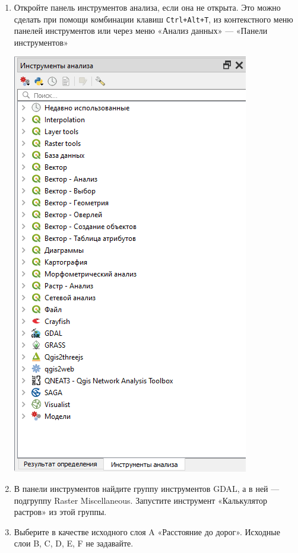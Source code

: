 \documentclass[
  12pt,
]{book}
\begin{document}
\begin{enumerate}
\def\labelenumi{\arabic{enumi}.}
\item
  Откройте панель инструментов анализа, если она не открыта. Это можно сделать при помощи комбинации клавиш \texttt{Ctrl+Alt+T}, из контекстного меню панелей инструментов или через меню «Анализ данных» --- «Панели инструментов»

  \includegraphics{images/Ex12/analysis.png}
\item
  В панели инструментов найдите группу инструментов GDAL, а в ней --- подгруппу Raster Miscellaneous. Запустите инструмент «Калькулятор растров» из этой группы.
\item
  Выберите в качестве исходного слоя A «Расстояние до дорог». Исходные слои B, C, D, E, F не задавайте.


\end{enumerate}
\end{document}
